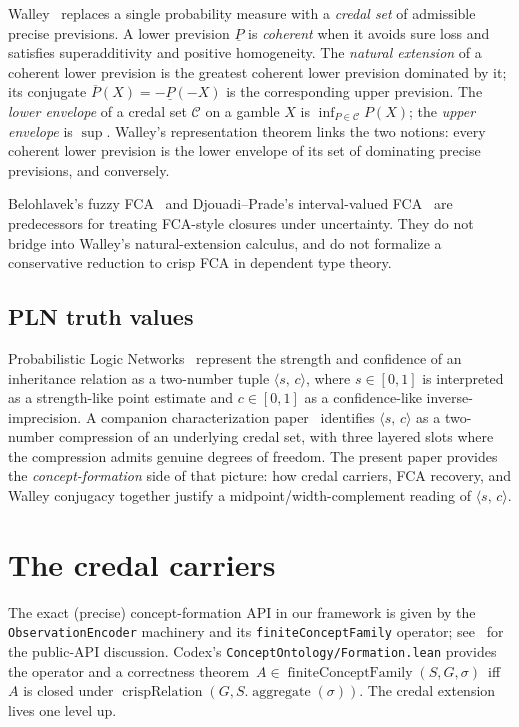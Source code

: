 \documentclass[]{article}
\newcommand{\lid}[1]{{\ttfamily\nolinkurl{#1}}}
\newcommand{\STV}[2]{\langle #1,\, #2 \rangle}
\begin{document}
Walley~\cite{walley1991} replaces a single probability measure with a \emph{credal
set} of admissible precise previsions. A lower prevision $\underline{P}$ is
\emph{coherent} when it avoids sure loss and satisfies superadditivity and positive
homogeneity. The \emph{natural extension} of a coherent lower prevision is the
greatest coherent lower prevision dominated by it; its conjugate $\overline{P}(X)
= -\underline{P}(-X)$ is the corresponding upper prevision. The
\emph{lower envelope} of a credal set $\mathcal{C}$ on a gamble $X$ is
$\inf_{P \in \mathcal{C}} P(X)$; the \emph{upper envelope} is $\sup$. Walley's
representation theorem links the two notions: every coherent lower prevision is the
lower envelope of its set of dominating precise previsions, and conversely.

Belohlavek's fuzzy FCA~\cite{belohlavek1999} and Djouadi--Prade's interval-valued
FCA~\cite{djouadi2009} are predecessors for treating FCA-style closures under
uncertainty. They do not bridge into Walley's natural-extension calculus, and do
not formalize a conservative reduction to crisp FCA in dependent type theory.

\subsection{PLN truth values}\label{sec:bg-pln}

Probabilistic Logic Networks~\cite{goertzel2008} represent the strength and
confidence of an inheritance relation as a two-number tuple $\STV{s}{c}$, where
$s \in [0,1]$ is interpreted as a strength-like point estimate and
$c \in [0,1]$ as a confidence-like inverse-imprecision. A companion characterization
paper~\cite{pln-credal-degrees-of-freedom} identifies $\STV{s}{c}$ as a two-number
compression of an underlying credal set, with three layered slots where the
compression admits genuine degrees of freedom. The present paper provides the
\emph{concept-formation} side of that picture: how credal carriers, FCA recovery,
and Walley conjugacy together justify a midpoint/width-complement reading of
$\STV{s}{c}$.

\section{The credal carriers}\label{sec:carriers}

The exact (precise) concept-formation API in our framework is given by the
\lid{ObservationEncoder} machinery and its
\lid{finiteConceptFamily} operator; see~\cite{wmpln_concept_formation_guidance} for
the public-API discussion. Codex's \lid{ConceptOntology/Formation.lean} provides the
operator and a correctness theorem
\(\,A \in \operatorname{finiteConceptFamily}(S,G,\sigma)\,\) iff \(A\) is closed
under \(\operatorname{crispRelation}(G,S.\operatorname{aggregate}(\sigma))\).
The credal extension lives one level up.
\end{document}
